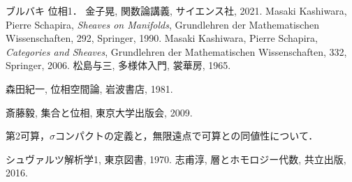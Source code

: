 \begin{thebibliography}{20} 
     ブルバキ 位相1．
     金子晃, 関数論講義, サイエンス社, 2021.
     Masaki Kashiwara, Pierre Schapira, 
        \textit{Sheaves on Manifolds}, 
        Grundlehren der Mathematischen Wissenschaften, 292, Springer, 1990.
     Masaki Kashiwara, Pierre Schapira, 
        \textit{Categories and Sheaves}, 
        Grundlehren der Mathematischen Wissenschaften, 332, Springer, 2006.
     松島与三, 多様体入門, 裳華房, 1965.
    
     森田紀一, 位相空間論, 岩波書店, 1981.

     斎藤毅, 集合と位相, 東京大学出版会, 2009.
        
        第2可算，\(\sigma\)コンパクトの定義と，無限遠点で可算との同値性について．

     シュヴァルツ解析学1, 東京図書, 1970.
     志甫淳, 層とホモロジー代数, 共立出版, 2016.
\end{thebibliography}




